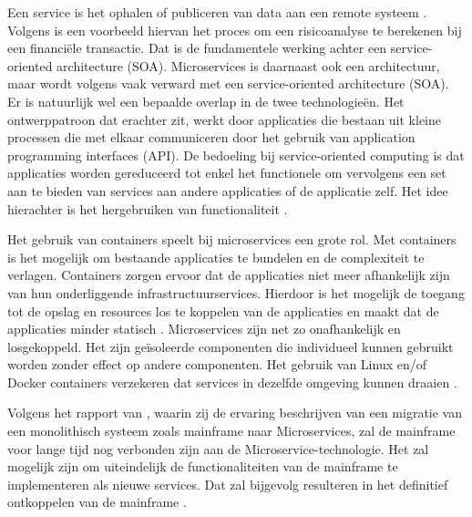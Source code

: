Een service is het ophalen of publiceren van data aan een remote systeem \autocite{Linthicum2016}. Volgens \textcite{Linthicum2016} is een voorbeeld hiervan het proces om een risicoanalyse te berekenen bij een financiële transactie. Dat is de fundamentele werking achter een service-oriented architecture (SOA). Microservices is daarnaast ook een architectuur, maar wordt volgens \textcite{Linthicum2016} vaak verward met een service-oriented architecture (SOA). Er is natuurlijk wel een bepaalde overlap in de twee technologieën. Het ontwerppatroon dat erachter zit, werkt door applicaties die bestaan uit kleine processen die met elkaar communiceren door het gebruik van application programming interfaces (API). De bedoeling bij service-oriented computing is dat applicaties worden gereduceerd tot enkel het functionele om vervolgens een set aan te bieden van services aan andere applicaties of de applicatie zelf. Het idee hierachter is het hergebruiken van functionaliteit \autocite{Linthicum2016}. 

Het gebruik van containers speelt bij microservices een grote rol. Met containers is het mogelijk om bestaande applicaties te bundelen en de complexiteit te verlagen. Containers zorgen ervoor dat de applicaties niet meer afhankelijk zijn van hun onderliggende infrastructuurservices. Hierdoor is het mogelijk de toegang tot de opslag en resources los te koppelen van de applicaties en maakt dat de applicaties minder statisch \autocite{Linthicum2016a}. Microservices zijn net zo onafhankelijk en losgekoppeld. Het zijn geïsoleerde componenten die individueel kunnen gebruikt worden zonder effect op andere componenten. Het gebruik van Linux en/of Docker containers verzekeren dat services in dezelfde omgeving kunnen draaien  \autocite{Bucchiarone2018}.

Volgens het rapport van \textcite{Bucchiarone2018}, waarin zij de ervaring beschrijven van een migratie van een monolithisch systeem zoals mainframe naar Microservices, zal de mainframe voor lange tijd nog verbonden zijn aan de Microservice-technologie. Het zal mogelijk zijn om uiteindelijk de functionaliteiten van de mainframe te implementeren als nieuwe services. Dat zal bijgevolg resulteren in het definitief ontkoppelen van de mainframe \autocite{Bucchiarone2018}. 


\subsection{}
\label{sec:Workloads migreren naar de cloud}


